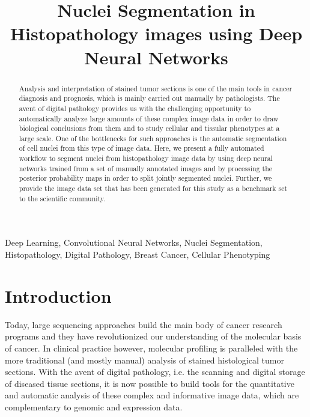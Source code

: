 \documentclass{article}
\title{Nuclei Segmentation in Histopathology
  images using Deep Neural Networks}
\begin{document}
%
\maketitle

%
\begin{abstract}
Analysis and interpretation of stained tumor sections is one of the
main tools in cancer diagnosis and prognosis, which is mainly carried
out manually by pathologists. The avent of digital pathology provides
us with the challenging opportunity to automatically analyze large
amounts of these complex image data in order to draw
biological conclusions from them and to study cellular and tissular
phenotypes at a large scale. One of the bottlenecks for such
approaches is the automatic segmentation of cell nuclei from this type
of image data. Here, we present a fully automated workflow to segment
nuclei from histopathology image data by using deep neural
networks trained from a set of manually annotated images and by processing
the posterior probability maps in order to split jointly segmented
nuclei. Further, we provide the image data set that has been generated
for this study as a benchmark set to the scientific community.  
\end{abstract}
%
\begin{keywords}
Deep Learning, Convolutional Neural Networks, Nuclei Segmentation,
Histopathology, Digital Pathology, Breast Cancer, Cellular Phenotyping
\end{keywords}
%
\section{Introduction}
\label{sec:intro}

\noindent Today, large sequencing approaches build the main body of cancer
research programs and they have revolutionized our understanding of
the molecular basis of cancer. In clinical practice however,
molecular profiling is paralleled with the more traditional
(and mostly manual) analysis of stained histological tumor
sections. With the avent of digital pathology, i.e. the scanning and
digital storage of diseased tissue sections, it is now possible to
build tools for the quantitative and automatic analysis of these
complex and informative image data, which are complementary to genomic
and expression data.

\end{document}
